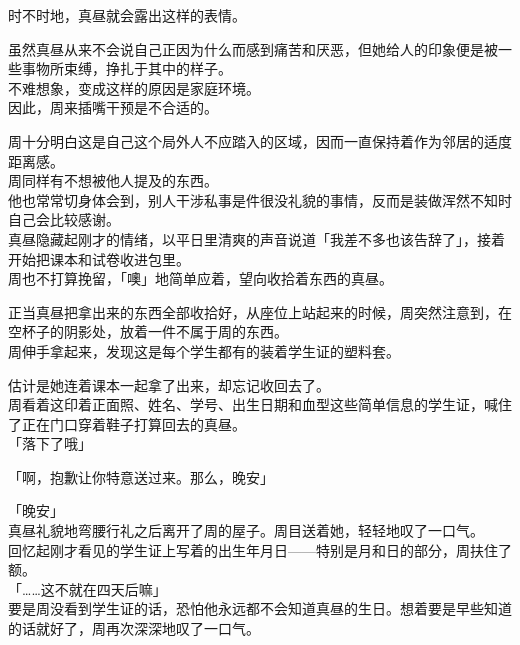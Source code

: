 时不时地，真昼就会露出这样的表情。

虽然真昼从来不会说自己正因为什么而感到痛苦和厌恶，但她给人的印象便是被一些事物所束缚，挣扎于其中的样子。\\

不难想象，变成这样的原因是家庭环境。\\

因此，周来插嘴干预是不合适的。

周十分明白这是自己这个局外人不应踏入的区域，因而一直保持着作为邻居的适度距离感。\\

周同样有不想被他人提及的东西。\\

他也常常切身体会到，别人干涉私事是件很没礼貌的事情，反而是装做浑然不知时自己会比较感谢。\\

真昼隐藏起刚才的情绪，以平日里清爽的声音说道「我差不多也该告辞了」，接着开始把课本和试卷收进包里。\\

周也不打算挽留，「噢」地简单应着，望向收拾着东西的真昼。

正当真昼把拿出来的东西全部收拾好，从座位上站起来的时候，周突然注意到，在空杯子的阴影处，放着一件不属于周的东西。\\

周伸手拿起来，发现这是每个学生都有的装着学生证的塑料套。

估计是她连着课本一起拿了出来，却忘记收回去了。\\

周看着这印着正面照、姓名、学号、出生日期和血型这些简单信息的学生证，喊住了正在门口穿着鞋子打算回去的真昼。\\

「落下了哦」

「啊，抱歉让你特意送过来。那么，晚安」

「晚安」\\

真昼礼貌地弯腰行礼之后离开了周的屋子。周目送着她，轻轻地叹了一口气。\\

回忆起刚才看见的学生证上写着的出生年月日——特别是月和日的部分，周扶住了额。\\

「……这不就在四天后嘛」\\

要是周没看到学生证的话，恐怕他永远都不会知道真昼的生日。想着要是早些知道的话就好了，周再次深深地叹了一口气。
